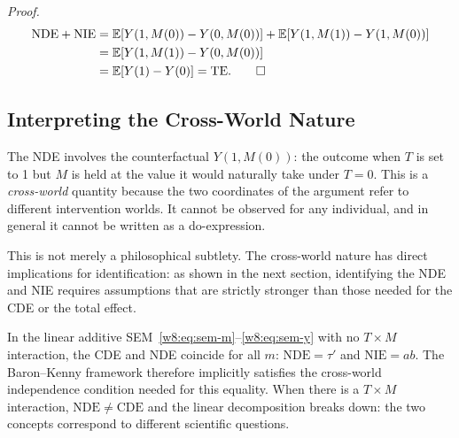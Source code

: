 \documentclass[master.tex]{subfiles}
\begin{document}
\noindent\textit{Proof.}
\begin{align*}
  \mathrm{NDE} + \mathrm{NIE}
  &= \mathbb{E}[Y(1, M(0)) - Y(0, M(0))]
   + \mathbb{E}[Y(1, M(1)) - Y(1, M(0))] \\
  &= \mathbb{E}[Y(1, M(1)) - Y(0, M(0))] \\
  &= \mathbb{E}[Y(1) - Y(0)]
  = \mathrm{TE}. \qquad\square
\end{align*}

\subsection{Interpreting the Cross-World Nature}

The NDE involves the counterfactual $Y(1, M(0))$: the outcome when $T$
is set to 1 but $M$ is held at the value it would naturally take under
$T = 0$.  This is a \emph{cross-world} quantity because the two
coordinates of the argument refer to different intervention worlds.  It
cannot be observed for any individual, and in general it cannot be
written as a do-expression.

This is not merely a philosophical subtlety.  The cross-world nature
has direct implications for identification: as shown in the next
section, identifying the NDE and NIE requires assumptions that are
strictly stronger than those needed for the CDE or the total effect.

\begin{remark}
In the linear additive SEM~\eqref{w8:eq:sem-m}--\eqref{w8:eq:sem-y}
with no $T \times M$ interaction, the CDE and NDE coincide for all
$m$: $\mathrm{NDE} = \tau'$ and $\mathrm{NIE} = ab$.  The
Baron--Kenny framework therefore implicitly satisfies the cross-world
independence condition needed for this equality.  When there is a
$T \times M$ interaction, $\mathrm{NDE} \neq \mathrm{CDE}$ and the
linear decomposition breaks down: the two concepts correspond to
different scientific questions.
\end{remark}
\end{document}
